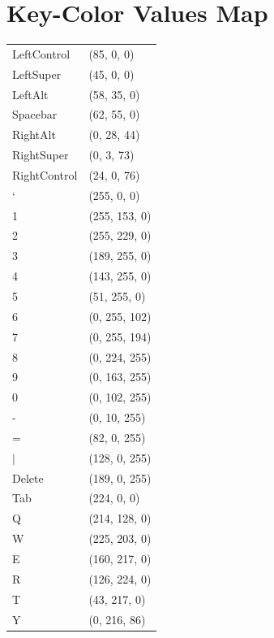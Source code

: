 \documentclass{report}
\begin{document}
\newpage
\appendix

\twocolumn
\chapter{Key-Color Values Map}
\label{appendix:key-map}

\centering
\small
\begin{supertabular}{ll}
	LeftControl & (85, 0, 0)\\
	LeftSuper & (45, 0, 0)\\
	LeftAlt & (58, 35, 0)\\
	Spacebar & (62, 55, 0)\\
	RightAlt & (0, 28, 44)\\
	RightSuper & (0, 3, 73)\\
	RightControl & (24, 0, 76)\\
	` & (255, 0, 0)\\
	1 & (255, 153, 0)\\
	2 & (255, 229, 0)\\
	3 & (189, 255, 0)\\
	4 & (143, 255, 0)\\
	5 & (51, 255, 0)\\
	6 & (0, 255, 102)\\
	7 & (0, 255, 194)\\
	8 & (0, 224, 255)\\
	9 & (0, 163, 255)\\
	0 & (0, 102, 255)\\
	- & (0, 10, 255)\\
	= & (82, 0, 255)\\
	$\vert$ & (128, 0, 255)\\
	Delete & (189, 0, 255)\\
	Tab & (224, 0, 0)\\
	Q & (214, 128, 0)\\
	W & (225, 203, 0)\\
	E & (160, 217, 0)\\
	R & (126, 224, 0)\\
	T & (43, 217, 0)\\
	Y & (0, 216, 86)\\

\end{supertabular}
\end{document}
